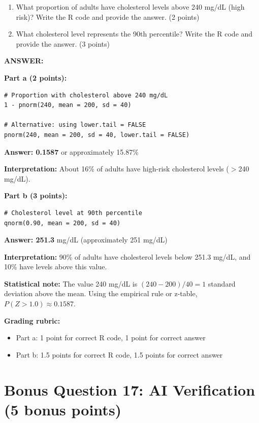\documentclass[11pt]{article}
\begin{document}
\begin{enumerate}
    \item[a)] What proportion of adults have cholesterol levels above 240 mg/dL (high risk)? Write the R code and provide the answer. (2 points)
    \item[b)] What cholesterol level represents the 90th percentile? Write the R code and provide the answer. (3 points)
\end{enumerate}

\textbf{ANSWER:}

\textbf{Part a (2 points):}

\begin{lstlisting}[style=Rstyle]
# Proportion with cholesterol above 240 mg/dL
1 - pnorm(240, mean = 200, sd = 40)

# Alternative: using lower.tail = FALSE
pnorm(240, mean = 200, sd = 40, lower.tail = FALSE)
\end{lstlisting}

\textbf{Answer: 0.1587} or approximately 15.87\%

\textbf{Interpretation:} About 16\% of adults have high-risk cholesterol levels ($>$240 mg/dL).

\textbf{Part b (3 points):}

\begin{lstlisting}[style=Rstyle]
# Cholesterol level at 90th percentile
qnorm(0.90, mean = 200, sd = 40)
\end{lstlisting}

\textbf{Answer: 251.3} mg/dL (approximately 251 mg/dL)

\textbf{Interpretation:} 90\% of adults have cholesterol levels below 251.3 mg/dL, and 10\% have levels above this value.

\textbf{Statistical note:} The value 240 mg/dL is $(240 - 200) / 40 = 1$ standard deviation above the mean. Using the empirical rule or z-table, $P(Z > 1.0) \approx 0.1587$.

\textbf{Grading rubric:}
\begin{itemize}
    \item Part a: 1 point for correct R code, 1 point for correct answer
    \item Part b: 1.5 points for correct R code, 1.5 points for correct answer
\end{itemize}

\vspace{0.3cm}
\noindent\hrulefill

\section*{Bonus Question 17: AI Verification (5 bonus points)}
\end{document}
